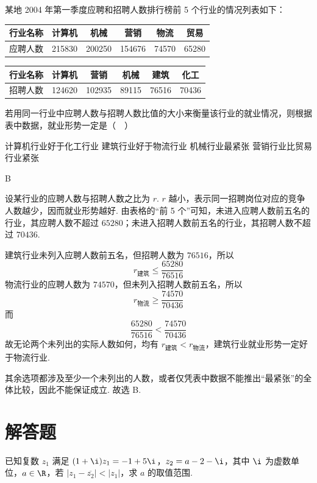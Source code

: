 \begin{problem}
某地 2004 年第一季度应聘和招聘人数排行榜前 5 个行业的情况列表如下：

\begin{center}
\begin{tabular}{|c|c|c|c|c|c|}
\hline
行业名称 & 计算机 & 机械 & 营销 & 物流 & 贸易 \\
\hline
应聘人数 & 215830 & 200250 & 154676 & 74570 & 65280 \\
\hline
\end{tabular}

\medskip

\begin{tabular}{|c|c|c|c|c|c|}
\hline
行业名称 & 计算机 & 营销 & 机械 & 建筑 & 化工 \\
\hline
招聘人数 & 124620 & 102935 & 89115 & 76516 & 70436 \\
\hline
\end{tabular}
\end{center}

若用同一行业中应聘人数与招聘人数比值的大小来衡量该行业的就业情况，则根据表中数据，就业形势一定是（\(\quad\)）

\choices
    {计算机行业好于化工行业}
    {建筑行业好于物流行业}
    {机械行业最紧张}
    {营销行业比贸易行业紧张}
\end{problem}

\begin{answer}
B
\end{answer}

\begin{solution}
设某行业的应聘人数与招聘人数之比为 \(r\). \(r\) 越小，表示同一招聘岗位对应的竞争人数越少，因而就业形势越好. 由表格的“前 5 个”可知，未进入应聘人数前五名的行业，其应聘人数不超过 \(65280\)；未进入招聘人数前五名的行业，其招聘人数不超过 \(70436\).

建筑行业未列入应聘人数前五名，但招聘人数为 \(76516\)，所以
\[
r_{\text{建筑}}\leqslant\frac{65280}{76516}
\]
物流行业的应聘人数为 \(74570\)，但未列入招聘人数前五名，所以
\[
r_{\text{物流}}\geqslant\frac{74570}{70436}
\]
而
\[
\frac{65280}{76516}<\frac{74570}{70436}
\]
故无论两个未列出的实际人数如何，均有 \(r_{\text{建筑}}<r_{\text{物流}}\)，建筑行业就业形势一定好于物流行业.

其余选项都涉及至少一个未列出的人数，或者仅凭表中数据不能推出“最紧张”的全体比较，因此不能保证成立. 故选 B.
\end{solution}

\section{解答题}
\begin{problem}
已知复数 \(z_{1}\) 满足 \((1 + \i)z_{1} = -1 + 5\i\)，\(z_{2} = a - 2 - \i\)，其中 \(\i\) 为虚数单位，\(a \in \R\)，若 \(\left|z_{1} - \overline{z_{2}}\right| < |z_{1}|\)，求 \(a\) 的取值范围.
\end{problem}

